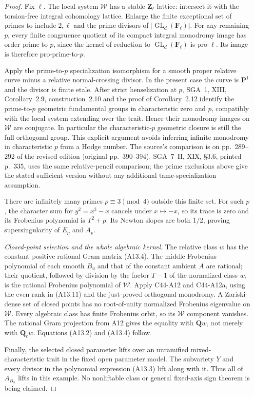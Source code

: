 \documentclass[11pt]{article}
\theoremstyle{remark}\newtheorem{remark}[theorem]{Remark}
\begin{document}
\begin{proof}
Fix $\ell$. The local system $\mathcal W$ has a stable
$\mathbf Z_\ell$ lattice: intersect it with the torsion-free
integral cohomology lattice. Enlarge the finite exceptional
set of primes to include $2,\ell$ and the prime divisors of
$|\operatorname{GL}_d(\mathbf F_\ell)|$.
For any remaining $p$, every finite congruence quotient of its
compact integral monodromy image has order prime to $p$,
since the kernel of reduction to $\operatorname{GL}_d(\mathbf
F_\ell)$ is pro-$\ell$. Its image is therefore pro-prime-to-$p$.

Apply the prime-to-$p$ specialization isomorphism for a smooth
proper relative curve minus a relative normal-crossing divisor.
In the present case the curve is $\mathbf P^1$ and the divisor
is finite etale. After strict henselization at $p$, SGA~1,
XIII, Corollary~2.9, construction~2.10 and the proof of
Corollary~2.12 identify the prime-to-$p$ geometric fundamental
groups in characteristic zero and $p$, compatibly with the
local system extending over the trait. Hence their monodromy
images on $\mathcal W$ are conjugate. In particular the
characteristic-$p$ geometric closure is still the full
orthogonal group. This explicit argument avoids inferring
infinite monodromy in characteristic $p$ from a Hodge number.
The source's comparison is on pp.~289--292 of the revised
edition (original pp.~390--394). SGA~7~II, XIX, \S3.6,
printed p.~335, uses the same relative-pencil comparison;
the prime exclusions above give the stated sufficient version
without any additional tame-specialization assumption.

There are infinitely many primes $p\equiv3\pmod4$ outside
this finite set. For such $p$, the character sum for
$y^2=x^3-x$ cancels under $x\mapsto-x$, so its trace is zero
and its Frobenius polynomial is $T^2+p$. Its Newton slopes
are both $1/2$, proving supersingularity of $E_p$ and $A_p$.

\emph{Closed-point selection and the whole algebraic kernel.}
The relative class $w$ has the constant positive rational
Gram matrix (A13.4). The middle Frobenius polynomial of each
smooth $B_u$ and that of the constant ambient $A$ are rational;
their quotient, followed by division by the factor $T-1$
of the normalized class $w$, is the rational Frobenius
polynomial of $\mathcal W$.
Apply C44-A12 and C44-A12a, using the even rank in (A13.11)
and the just-proved orthogonal monodromy. A Zariski-dense set
of closed points has no root-of-unity normalized Frobenius
eigenvalue on $\mathcal W$. Every algebraic class has finite
Frobenius orbit, so its $\mathcal W$ component vanishes.
The rational Gram projection from A12 gives the equality
with $\mathbf Qw$, not merely with $\mathbf Q_\ell w$.
Equations (A13.2) and (A13.4) follow.

Finally, the selected closed parameter lifts over an unramified
mixed-characteristic trait in the fixed open parameter model.
The subvariety $Y$ and every divisor in the polynomial
expression (A13.3) lift along with it. Thus all of $A_{B_u}$
lifts in this example. No nonliftable class or general
fixed-axis sign theorem is being claimed.
\end{proof}
\end{document}
